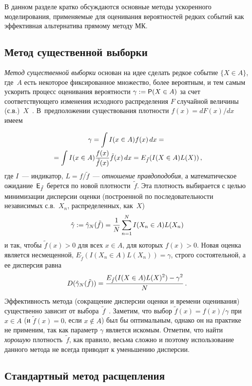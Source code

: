 \begin{multicols}{2}
В данном разделе кратко обсуждаются основные методы ускоренного
моделирования, применяемые для оценивания вероятностей редких
событий как эффективная альтернатива  прямому методу МК.

\subsection{Метод существенной выборки}

\textit{Метод существенной выборки} основан на идее сделать редкое
событие $\{X\in A\}$, где~$A$ есть некоторое фиксированное
множество, более вероятным, и тем самым ускорить процесс оценивания
вероятности $\gamma:={\sf P}(X\in A)$ за счет соответствующего изменения
исходного распределения $F$ случайной величины (с.в.)~$X$~\cite{Asmus, Melas}. 
В~предположении существования плотности
$f(x)=dF(x)/dx$ имеем

\noindent
\begin{multline*}
\gamma=\int I(x \in A)f(x)\,dx ={}\\
{}=  \int I(x \in
A)\displaystyle\frac{\displaystyle f(x)\mathstrut}{\displaystyle \tilde{f}(x)\mathstrut}\tilde{f}(x)\,dx = E_{\tilde{f}}(I(X \in A)L(X))\,,
\end{multline*}
где $I$~--- индикатор, $L=f/\tilde f$~--- \textit{отношение
правдоподобия}, а  математическое ожидание~${\sf E}_{\tilde{f}}$ берется
по  новой плотности~$\tilde{f}$.  Эта плотность выбирается с целью
минимизации дисперсии оценки (построенной по последовательности
независимых с.в.\  $X_n$, распределенных, как~$X$)
$$
\hat\gamma := \hat\gamma_N (\tilde{f}) =
\displaystyle\frac{\displaystyle 1\mathstrut}{\displaystyle N\mathstrut}\sum\limits_{n=1}^{N}I(X_n \in A)L(X_n)
$$
и так, чтобы $\tilde{f}(x) > 0$ для всех $x\in A$, для которых
$f(x)>0$. Новая оценка является несмещенной,  $E_{\tilde{f}}(I(X_n
\in A)L(X_n))= \gamma$, строго состоятельной, а ее дисперсия равна
$$
D (\hat\gamma_N(\tilde{f})) = \displaystyle\frac{\displaystyle E_{\tilde{f}}(I(X \in A)L(X)^2)
- \gamma^2\mathstrut}{\displaystyle N\mathstrut}\,.
$$
Эффективность метода (сокращение дисперсии оценки и времени
оценивания) существенно зависит от  выбора~$\tilde{f}$~\cite{Heidelberg}. Заметим, что 
выбор $\tilde{f}(x) = f(x)/\gamma$
при $x\in A$ (и $\tilde{f}(x)=0$, если $x\not \in A$) был бы
оптимальным, однако он  на практике не применим, так как параметр
$\gamma$ является искомым. Отметим, что найти \textit{хорошую}
плотность~$\tilde{f}$,  как правило, весьма сложно и поэтому
использование данного метода не всегда приводит к уменьшению
дисперсии.

\subsection{Стандартный метод  расщепления}


\end{multicols}
